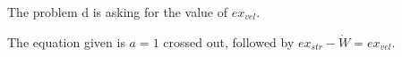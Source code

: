 The problem d is asking for the value of \( ex_{vel} \).

The equation given is \( a = 1 \) crossed out, followed by \( ex_{str} - \dot{W} = ex_{vel} \).